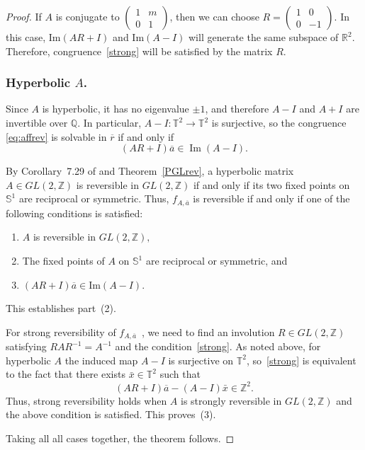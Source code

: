 \documentclass[12pt]{amsart}
\theoremstyle{plain}
\theoremstyle{definition}
\theoremstyle{remark}
\begin{document}
\begin{proof}
If $A$ is conjugate to $\begin{pmatrix}
1 & m\\
0 & 1
\end{pmatrix}$, then we can choose $R=\begin{pmatrix}
1 & 0\\
0 & -1
\end{pmatrix}$. In this case, $\text{Im}(AR+I)$ and $\text{Im}(A-I)$ will generate the same subspace of $\mathbb{R}^2$. Therefore, congruence~\eqref{strong} will be satisfied by the matrix $R.$ 


\subsubsection*{\textbf{Hyperbolic $A$}.}
Since $A$ is hyperbolic, it has no eigenvalue $\pm1$, and therefore $A-I$ and $A+I$ are invertible over $\mathbb Q$.  In particular,
$A-I:\mathbb T^2\to\mathbb T^2$ is surjective, so the congruence
\eqref{eq:affrev} is solvable in $\overline{r}$ if and only if
$$
(AR+I)\overline{a}\in\operatorname{Im}(A-I).
$$

By Corollary~7.29 of \cite{IS} and Theorem~\ref{PGLrev}, a hyperbolic matrix
$A\in GL(2,\mathbb Z)$ is reversible in $GL(2,\mathbb Z)$ if and only if its two
fixed points on $\mathbb S^1$ are reciprocal or symmetric.  Thus, $f_{A,\overline{a}}$ is reversible if
and only if one of the following conditions is satisfied:
\begin{enumerate}
\item[(i)] $A$ is reversible in $GL(2,\mathbb Z),$

\item[(ii)] The fixed points of $A$ on $\mathbb{S}^1$ are reciprocal
or symmetric, and
\item[(iii)] $(AR+I)\overline{a}\in\mathrm{Im}(A-I)$.
\end{enumerate}
This establishes part~(2).

 For strong reversibility of $f_{A,\overline{a}}$~, we need to find an involution $R\in GL(2,\mathbb Z)$ satisfying $RAR^{-1}=A^{-1}$ and the condition~\eqref{strong}.  As noted above, for hyperbolic $A$ the induced map
$A-I$ is surjective on $\mathbb T^2$, so~\eqref{strong} is equivalent to the fact that there exists $\bar{x}\in\mathbb T^2 $ such that $$(AR+I)\overline{a} - (A-I)\bar{x} \in \mathbb Z^2.$$
Thus, strong reversibility holds when $A$ is strongly reversible in
$GL(2,\mathbb Z)$ and the above condition  is satisfied. This proves~(3).

Taking all all cases together, the theorem follows.
\end{proof}
\end{document}
